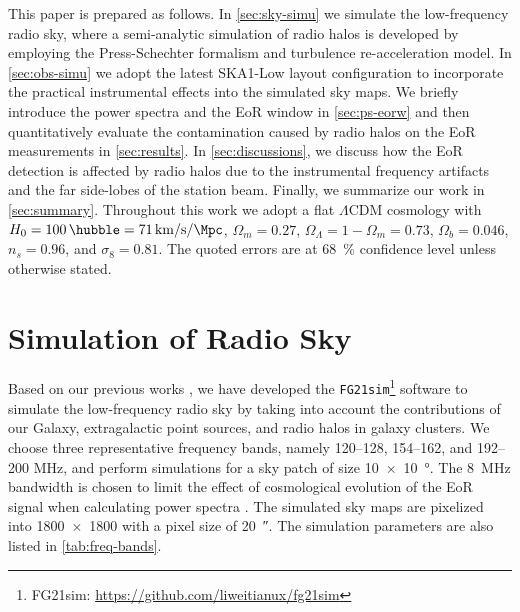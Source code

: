 \documentclass[twocolumn]{aastex62}
\newcommand{\lcdm}{$\Lambda$CDM}
\newcommand{\editone}[1]{{\leavevmode\color{cyan}#1}}
\begin{document}
This paper is prepared as follows.
In \autoref{sec:sky-simu} we simulate the low-frequency radio sky, where a
\editone{semi-analytic} simulation of radio halos is developed by employing
the Press-Schechter formalism and turbulence re-acceleration model.
In \autoref{sec:obs-simu} we adopt the latest SKA1-Low layout
configuration to incorporate the practical instrumental effects into
the simulated sky maps.
We briefly introduce the power spectra and the EoR window in
\autoref{sec:ps-eorw}
and then quantitatively evaluate the contamination caused by radio halos
on the EoR measurements in \autoref{sec:results}.
In \autoref{sec:discussions}, we discuss how the EoR detection is
affected by radio halos due to the instrumental frequency artifacts
and the far side-lobes of the station beam.
Finally, we summarize our work in \autoref{sec:summary}.
Throughout this work we adopt a flat \lcdm{} cosmology with
$H_0 = \SI{100}{\hubble} = \SI{71}{\km\per\second\per\Mpc}$,
$\Omega_m = 0.27$, $\Omega_{\Lambda} = 1 - \Omega_m = 0.73$,
$\Omega_b = 0.046$, $n_s = 0.96$, and $\sigma_8 = 0.81$.
The quoted errors are at \SI{68}{\percent} confidence level unless
otherwise stated.


\section{Simulation of Radio Sky}
\label{sec:sky-simu}

Based on our previous works \citep{wang2010,wang2013}, we have developed
the \texttt{FG21sim}\footnote{%
  FG21sim: \url{https://github.com/liweitianux/fg21sim}}
software to simulate the low-frequency
radio sky by taking into account the contributions of our Galaxy,
extragalactic point sources, and radio halos in galaxy clusters.
We choose three representative frequency bands, namely
\numrange{120}{128}, \numrange{154}{162}, and \numrange{192}{200}
\si{\MHz}, and perform simulations for a sky patch of size
\SI[product-units=repeat]{10 x 10}{\degree}.
The \SI{8}{\MHz} bandwidth is chosen to limit the effect of
cosmological evolution of the EoR signal when calculating power
spectra \citep[e.g.][]{wyithe2004,thyagarajan2013}.
The simulated sky maps are pixelized into \num{1800 x 1800} with a pixel
size of \SI{20}{\arcsecond}.
The simulation parameters are also listed in \autoref{tab:freq-bands}.
\end{document}
